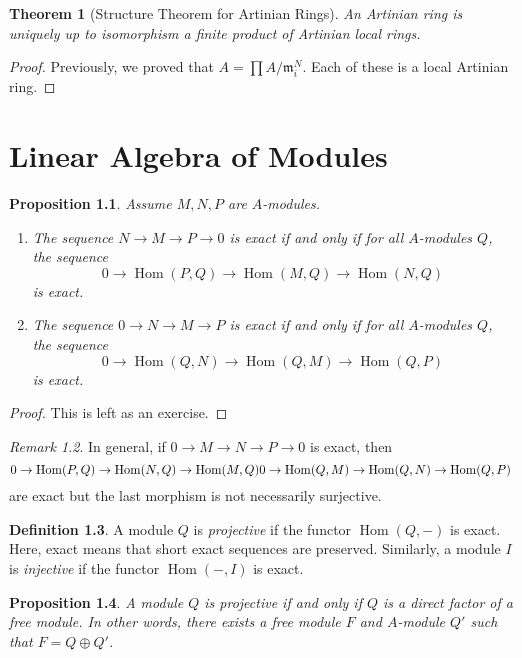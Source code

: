 \documentclass[leqno, openany]{memoir}
\newtheorem{thm}{Theorem}[section]
\newtheorem{prop}[thm]{Proposition}
\theoremstyle{definition}
\newtheorem{defn}[thm]{Definition}
\theoremstyle{remark}
\newtheorem{rmk}[thm]{Remark}
\theoremstyle{plain}
\theoremstyle{definition}
\theoremstyle{remark}
\newcommand{\mf}[1]{\mathfrak{#1}}
\DeclareMathOperator{\Hom}{Hom}
\begin{document}
\begin{thm}[Structure Theorem for Artinian Rings]
    An Artinian ring is uniquely up to isomorphism a finite product of Artinian local rings.
\end{thm}

\begin{proof}
    Previously, we proved that $A = \prod A / \mf{m}_i^N$. Each of these is a local Artinian ring.
\end{proof}

\chapter{Linear Algebra of Modules}%
\label{cha:linear_algebra_of_modules}

\begin{prop}
    Assume $M, N, P$ are $A$-modules.
    \begin{enumerate}
        \item The sequence $N \to M \to P \to 0$ is exact if and only if for all $A$-modules $Q$, the sequence
            \[ 0 \to \Hom(P,Q) \to \Hom(M,Q) \to \Hom(N,Q) \]
            is exact.
        \item The sequence $0 \to N \to M \to P $ is exact if and only if for all $A$-modules $Q$, the sequence
            \[ 0 \to \Hom(Q,N) \to \Hom(Q,M) \to \Hom(Q,P) \]
            is exact.
    \end{enumerate}
\end{prop}

\begin{proof}
    This is left as an exercise.
\end{proof}

\begin{rmk}
    In general, if $0 \to M \to N \to P \to 0$ is exact, then
    \[ 0 \to \Hom(P,Q) \to \Hom(N,Q) \to \Hom(M,Q) \\
    0 \to  \Hom(Q,M) \to \Hom(Q,N) \to \Hom(Q,P) \]
    are exact but the last morphism is not necessarily surjective.
\end{rmk}

\begin{defn}
    A module $Q$ is \textit{projective} if the functor $\Hom(Q,-)$ is exact. Here, exact means that short exact sequences are preserved. Similarly, a module $I$ is \textit{injective} if the functor $\Hom(-,I)$ is exact.
\end{defn}

\begin{prop}
    A module $Q$ is projective if and only if $Q$ is a direct factor of a free module. In other words, there exists a free module $F$ and $A$-module $Q'$ such that $F = Q \oplus Q'$.
\end{prop}
\end{document}
